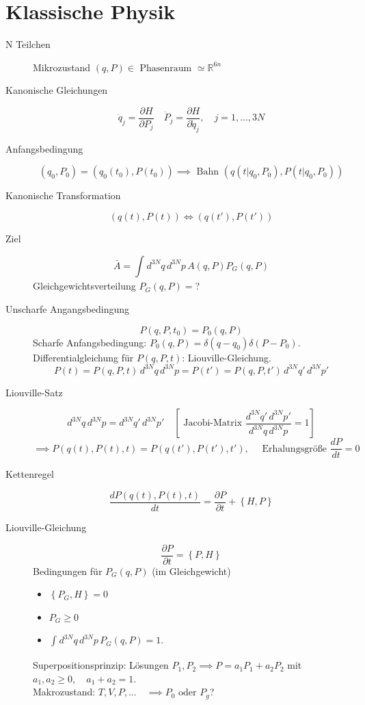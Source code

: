 \documentclass[11pt]{article}
\theoremstyle{plain}
\theoremstyle{mytheoremstyle}
\newcommand{\R}{\mathbb{R}}
\newcommand{\pd}[2]{\frac{\partial #1 }{\partial #2}}
\begin{document}
\section{Klassische Physik}
\begin{description}
  \item[N Teilchen ] Mikrozustand $(q,P) \in  \text{ Phasenraum } \simeq \R^{6n}$
  \item[Kanonische Gleichungen] \[ \dot{q}_j = \pd{H}{P_j} \quad \dot{P}_j = \pd{H}
    {\dot{q}_j}, \quad j=1,...,3N \] 
  \item[Anfangsbedingung] \[ (q_0, P_0)= (q_0(t_0), P(t_0)) \implies \text{ Bahn }
    (q(t | q_0, P_0), P(t| q_0, P_0)) \] 
  \item[Kanonische Transformation ] \[ (q(t), P(t)) \iff (q(t'), P(t')) \] 
  \item[Ziel] \[ \bar{A}= \int_{}^{} d^{3N}q\, d^{3N}p\, A(q,P) P_G(q,P) \] 
    Gleichgewichtsverteilung $P_G(q,P)= $?
  \item[Unscharfe Angangsbedingung] \[ P(q,P,t_0)= P_0 (q,P) \] 
    Scharfe Anfangsbedingung: $P_0(q,P) = \delta(q-q_0) \delta (P-P_0)$.
    Differentialgleichung f\"ur $P(q,P,t)$: Liouville-Gleichung.
    \[ P(t)= P(q,P,t)\, d^{3N}q\, d^{3N}p=P(t') = P(q,P,t')\, d^{3N}q'\, d^{3N}p' \] 
  \item[Liouville-Satz] \[ d^{3N}q\, d^{3N}p = d^{3N}q'\, d^{3N}p' \quad \left[
    \text{ Jacobi-Matrix } \frac{d^{3N}q'\, d^{3N}p'}{d^{3N}q\, d^{3N}p}= 1 \right] \] 
    \[ \implies P(q(t), P(t), t)= P(q(t'), P(t'), t'), \quad
    \text{ Erhalungsgr\"o\ss{}e } \frac{dP}{dt}=0 \] 
  \item[Kettenregel] \[ \frac{d P(q(t), P(t),t)}{dt}= \pd{P}{t} + \left\{ H,P \right\} \] 
  \item[Liouville-Gleichung] \[ \pd{P}{t}= \left\{ P,H \right\} \] 
    Bedingungen f\"ur $P_G(q,P)$ (im Gleichgewicht)
    \begin{itemize}
      \item $\left\{ P_G, H \right\}=0$
      \item $P_G \ge 0$
      \item $\int_{}^{}d^{3N}q\, d^{3N}p\, P_G (q,P)=1$.
    \end{itemize}
    Superpositionsprinzip: L\"osungen $P_1,P_2 \implies P=a_1 P_1+ a_2 P_2 $
    mit $a_1,a_2 \ge 0, \quad a_1+a_2 =1$. \\
    Makrozustand: $T,V,P,... \quad  \implies P_0 \text{ oder } P_g$?\\
\end{description}
\end{document}
